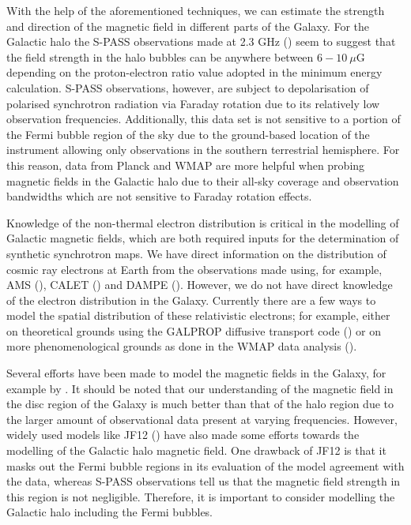 \documentclass[usenatbib]{mnras}
\begin{document}
With the help of the aforementioned techniques, we can estimate the strength and direction of the magnetic field in different parts of the Galaxy. 
For the Galactic halo the S-PASS observations made at 2.3 GHz (\cite{Carretti_2013}) seem to suggest that the field strength in the halo bubbles can be anywhere between $6-10~\mu $G depending on the proton-electron ratio value adopted in the minimum energy calculation. S-PASS observations, however, are subject to depolarisation of polarised synchrotron radiation via Faraday rotation due to its relatively low observation frequencies. Additionally, this data set is not sensitive to a portion of the Fermi bubble region of the sky due to the ground-based location of the instrument allowing only observations in the southern terrestrial hemisphere. For this reason, data from Planck and WMAP are more helpful when probing magnetic fields in the Galactic halo due to their all-sky coverage and observation bandwidths which are not sensitive to Faraday rotation effects.

Knowledge of the non-thermal electron distribution is critical in the modelling of Galactic magnetic fields, which are both required inputs for the determination of synthetic synchrotron maps.
We have direct information on the distribution of cosmic ray electrons at Earth from the observations made using, for example, AMS (\cite{AMS_2002, AMS_2014}), CALET (\cite{Calet_2017}) and DAMPE (\cite{Dampe_2017}). However, we do not have direct knowledge of the electron distribution in the Galaxy.
Currently there are a few ways to model the spatial distribution of these relativistic electrons; for example, either on theoretical grounds using the GALPROP diffusive transport code (\cite{Hammurabi, Orlando_2011}) or on more phenomenological grounds as done in the WMAP data analysis (\cite{WMAP_Page}).


Several efforts have been made to model the magnetic fields in the Galaxy, for example by \cite{Sun_2008, Jaffe_2010, Jaffe_2011, JF12}. It should be noted that our understanding of the magnetic field in the disc region of the Galaxy is much better than that of the halo region due to the larger amount of observational data present at varying frequencies. However, widely used models like JF12 (\cite{JF12}) have also made some efforts towards the modelling of the Galactic halo magnetic field. One drawback of JF12 is that it masks out the Fermi bubble regions in its evaluation of the model agreement with the data, whereas S-PASS  observations \citep{Carretti_2013} tell us that the magnetic field strength in this region is not negligible. Therefore, it is important to consider modelling the Galactic halo including the Fermi bubbles.
\end{document}

